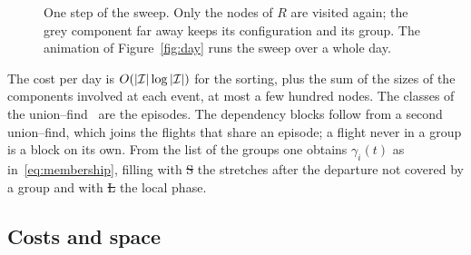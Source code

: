 \begin{figure}
\centering
{}
\caption{One step of the sweep. Only the nodes of $R$ are visited again; the grey component far
away keeps its configuration and its group. The animation of Figure~\ref{fig:day} runs the sweep over a whole
day.}
\label{fig:sweep}
\end{figure}

The cost per day is $O(|\mathcal{I}|\log|\mathcal{I}|)$ for the sorting, plus the sum of the sizes of the
components involved at each event, at most a few hundred nodes. The classes of the
union--find~\cite{tarjan1975} are the episodes. The dependency blocks follow from a second
union--find, which joins the flights that share an episode; a flight never in a group is a block
on its own. From the list of the groups one obtains $\gamma_i(t)$ as
in~\eqref{eq:membership}, filling with \st{S} the stretches after the departure not covered by a
group and with \st{L} the local phase.

\subsection{Costs and space}\label{sec:costs}

